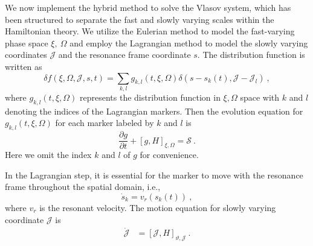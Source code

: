 We now implement the hybrid method to solve the Vlasov system, which has been structured to separate the fast and slowly varying scales within the Hamiltonian theory. We utilize the Eulerian method to model the fast-varying phase space $\xi,~\Omega$ and employ the Lagrangian method to model the slowly varying coordinates $\mathcal{J}$ and the resonance frame coordinate $s$.
The distribution function is written as \cite{shiroto2022}
\begin{equation}
    \delta f(\xi,\Omega,\mathcal{J},s,t) = \sum_{k,l} g_{k,l}(t,\xi,\Omega)\delta(s-s_k(t),\mathcal{J}-\mathcal{J}_l)~,
\end{equation}
where $g_{k,l}(t,\xi,\Omega)$ represents the distribution function in $\xi,\Omega$ space with $k$ and $l$ denoting the indices of the Lagrangian markers. 
Then the evolution equation for $g_{k,l}(t,\xi,\Omega)$ for each marker labeled by $k$ and $l$ is
\begin{equation}\label{eq.Euler}
\frac{\partial g}{\partial t} + \left[g,H\right]_{\xi,\Omega} = \mathcal{S}~.
\end{equation}
Here we omit the index $k$ and $l$ of $g$ for convenience.

In the Lagrangian step, it is essential for the marker to move  with the resonance frame throughout the spatial domain, i.e.,
\begin{equation}\label{eq.resonance}
        \dot{s}_k = v_r(s_k(t))~,
\end{equation}
where $v_r$ is  the  resonant velocity.
The motion equation for slowly varying coordinate $\mathcal{J}$ is
\begin{equation}
    \begin{aligned}\label{eq.Lagrangian}
        \dot{\mathcal{J}} &= \left[\mathcal{J},H\right]_{\vartheta,\mathcal{J}}~.
    \end{aligned}
\end{equation}

